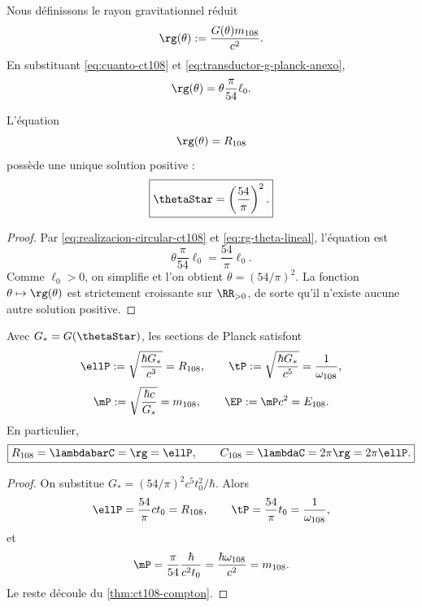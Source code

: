 Nous définissons le rayon gravitationnel réduit
\begin{equation}
\rg(\theta):=\frac{G(\theta)m_{108}}{c^2}.
\label{eq:radio-gravitatorio-reducido}
\end{equation}
En substituant \eqref{eq:cuanto-ct108} et
\eqref{eq:transductor-g-planck-anexo},
\begin{equation}
\rg(\theta)
=\theta\frac{\pi}{54}\ell_0.
\label{eq:rg-theta-lineal}
\end{equation}

\begin{theorem}
\label{thm:selector-autodual-ct108}
L’équation
\[
\rg(\theta)=R_{108}
\]
possède une unique solution positive :
\begin{equation}
\boxed{\thetaStar=\left(\frac{54}{\pi}\right)^2.}
\label{eq:theta-star}
\end{equation}
\end{theorem}

\begin{proof}
Par \eqref{eq:realizacion-circular-ct108} et
\eqref{eq:rg-theta-lineal}, l’équation est
\[
\theta\frac{\pi}{54}\ell_0
=\frac{54}{\pi}\ell_0.
\]
Comme \(\ell_0>0\), on simplifie et l’on obtient
\(\theta=(54/\pi)^2\). La fonction
\(\theta\mapsto\rg(\theta)\) est strictement croissante sur
\(\RR_{>0}\), de sorte qu’il n’existe aucune autre solution positive.
\end{proof}

\begin{corollary}
\label{cor:unidad-planck-interna}
Avec \(G_*=G(\thetaStar)\), les sections de Planck satisfont
\begin{equation}
\ellP:=\sqrt{\frac{\hbar G_*}{c^3}}=R_{108},
\qquad
\tP:=\sqrt{\frac{\hbar G_*}{c^5}}=\frac1{\omega_{108}},
\label{eq:planck-long-time-ct108}
\end{equation}
\begin{equation}
\mP:=\sqrt{\frac{\hbar c}{G_*}}=m_{108},
\qquad
\EP:=\mP c^2=E_{108}.
\label{eq:planck-mass-energy-ct108}
\end{equation}
En particulier,
\begin{equation}
\boxed{
R_{108}=\lambdabarC=\rg=\ellP,
\qquad
C_{108}=\lambdaC=2\pi\rg=2\pi\ellP.}
\label{eq:tres-lectores-planck}
\end{equation}
\end{corollary}

\begin{proof}
On substitue \(G_*=(54/\pi)^2c^5t_0^2/\hbar\). Alors
\[
\ellP=\frac{54}{\pi}ct_0=R_{108},
\qquad
\tP=\frac{54}{\pi}t_0=\frac1{\omega_{108}},
\]
et
\[
\mP=\frac{\pi}{54}\frac{\hbar}{c^2t_0}
=\frac{\hbar\omega_{108}}{c^2}=m_{108}.
\]
Le reste découle du \cref{thm:ct108-compton}.
\end{proof}

